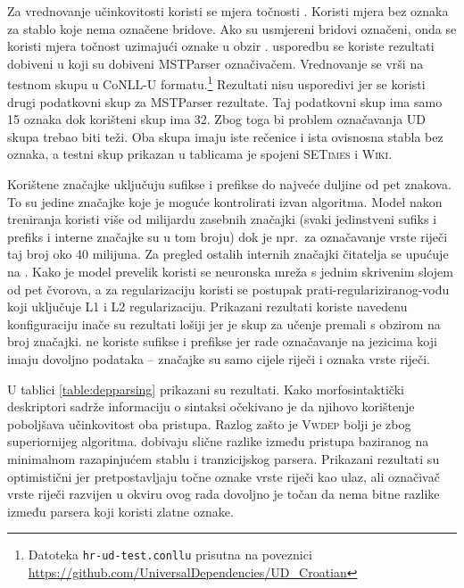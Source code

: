 Za vrednovanje učinkovitosti koristi se mjera točnosti . Koristi
mjera bez oznaka  za stablo koje nema
označene bridove. Ako su usmjereni bridovi označeni, onda se koristi mjera
točnost uzimajući oznake u obzir .
usporedbu se koriste rezultati dobiveni u \citep{agic2013three} koji su dobiveni
MSTParser označivačem. Vrednovanje se vrši na testnom skupu u CoNLL-U
formatu.\footnote{Datoteka \texttt{hr-ud-test.conllu} prisutna na poveznici
\url{https://github.com/UniversalDependencies/UD_Croatian}} Rezultati nisu
usporedivi jer se koristi drugi podatkovni skup za MSTParser rezultate. Taj
podatkovni skup ima samo 15 oznaka dok korišteni skup ima 32. Zbog toga bi
problem označavanja UD skupa trebao biti teži. Oba skupa imaju iste rečenice i
ista ovisnosna stabla bez oznaka, a testni skup prikazan u tablicama je spojeni
\textsc{SETimes} i \textsc{Wiki}.

Korištene značajke uključuju sufikse i prefikse do najveće duljine od pet
znakova. To su jedine značajke koje je moguće kontrolirati izvan algoritma.
Model nakon treniranja koristi više od milijardu zasebnih značajki (svaki
jedinstveni sufiks i prefiks i interne značajke su u tom broju) dok je npr.~za
označavanje vrste riječi taj broj oko 40 milijuna. Za pregled ostalih internih
značajki čitatelja se upućuje na \citep{chang2015learning}. Kako je model
prevelik koristi se neuronska mreža s jednim skrivenim slojem od pet čvorova, a
za regularizaciju koristi se postupak prati-regulariziranog-vođu  koji uključuje L1 i L2 regularizaciju. Prikazani
rezultati koriste navedenu konfiguraciju inače su rezultati lošiji jer je skup
za učenje premali s obzirom na broj značajki. \citet{chang2015learning} ne
koriste sufikse i prefikse jer rade označavanje na jezicima koji imaju dovoljno
podataka -- značajke su samo cijele riječi i oznaka vrste riječi.

U tablici \ref{table:depparsing} prikazani su rezultati. Kako morfosintaktički
deskriptori sadrže informaciju o sintaksi očekivano je da njihovo korištenje
poboljšava učinkovitost oba pristupa. Razlog zašto je \textsc{Vwdep} bolji je
zbog superiornijeg algoritma. \citet{cer2010parsing} dobivaju slične razlike
između pristupa baziranog na minimalnom razapinjućem stablu i tranzicijskog
parsera. Prikazani rezultati su optimistični jer pretpostavljaju točne oznake
vrste riječi kao ulaz, ali označivač vrste riječi razvijen u okviru ovog rada
dovoljno je točan da nema bitne razlike između parsera koji koristi zlatne
oznake.


